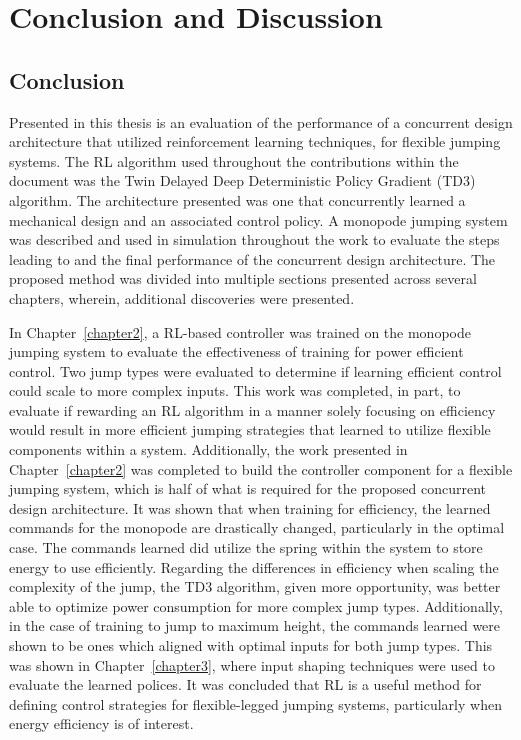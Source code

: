 \chapter{Conclusion and Discussion}
\label{chapter6}

\section{Conclusion}

Presented in this thesis is an evaluation of the performance of a concurrent design architecture that utilized reinforcement learning techniques, for flexible jumping systems. The RL algorithm used throughout the contributions within the document was the Twin Delayed Deep Deterministic Policy Gradient (TD3) algorithm. The architecture presented was one that concurrently learned a mechanical design and an associated control policy. A monopode jumping system was described and used in simulation throughout the work to evaluate the steps leading to and the final performance of the concurrent design architecture. The proposed method was divided into multiple sections presented across several chapters, wherein, additional discoveries were presented. 

In Chapter~\ref{chapter2}, a RL-based controller was trained on the monopode jumping system to evaluate the effectiveness of training for power efficient control. Two jump types were evaluated to determine if learning efficient control could scale to more complex inputs. This work was completed, in part, to evaluate if rewarding an RL algorithm in a manner solely focusing on efficiency would result in more efficient jumping strategies that learned to utilize flexible components within a system. Additionally, the work presented in Chapter~\ref{chapter2} was completed to build the controller component for a flexible jumping system, which is half of what is required for the proposed concurrent design architecture. It was shown that when training for efficiency, the learned commands for the monopode are drastically changed, particularly in the optimal case. The commands learned did utilize the spring within the system to store energy to use efficiently. Regarding the differences in efficiency when scaling the complexity of the jump, the TD3 algorithm, given more opportunity, was better able to optimize power consumption for more complex jump types. Additionally, in the case of training to jump to maximum height, the commands learned were shown to be ones which aligned with optimal inputs for both jump types. This was shown in Chapter~\ref{chapter3}, where input shaping techniques were used to evaluate the learned polices. It was concluded that RL is a useful method for defining control strategies for flexible-legged jumping systems, particularly when energy efficiency is of interest.

